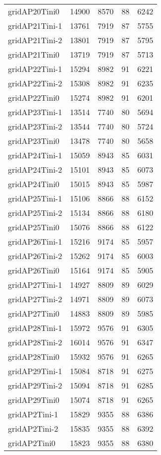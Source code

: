 \begin{longtable}{lrrrr}
gridAP20Tini0 & 14900 & 8570 & 88 & 6242 \\
gridAP21Tini-1 & 13761 & 7919 & 87 & 5755 \\
gridAP21Tini-2 & 13801 & 7919 & 87 & 5795 \\
gridAP21Tini0 & 13719 & 7919 & 87 & 5713 \\
gridAP22Tini-1 & 15294 & 8982 & 91 & 6221 \\
gridAP22Tini-2 & 15308 & 8982 & 91 & 6235 \\
gridAP22Tini0 & 15274 & 8982 & 91 & 6201 \\
gridAP23Tini-1 & 13514 & 7740 & 80 & 5694 \\
gridAP23Tini-2 & 13544 & 7740 & 80 & 5724 \\
gridAP23Tini0 & 13478 & 7740 & 80 & 5658 \\
gridAP24Tini-1 & 15059 & 8943 & 85 & 6031 \\
gridAP24Tini-2 & 15101 & 8943 & 85 & 6073 \\
gridAP24Tini0 & 15015 & 8943 & 85 & 5987 \\
gridAP25Tini-1 & 15106 & 8866 & 88 & 6152 \\
gridAP25Tini-2 & 15134 & 8866 & 88 & 6180 \\
gridAP25Tini0 & 15076 & 8866 & 88 & 6122 \\
gridAP26Tini-1 & 15216 & 9174 & 85 & 5957 \\
gridAP26Tini-2 & 15262 & 9174 & 85 & 6003 \\
gridAP26Tini0 & 15164 & 9174 & 85 & 5905 \\
gridAP27Tini-1 & 14927 & 8809 & 89 & 6029 \\
gridAP27Tini-2 & 14971 & 8809 & 89 & 6073 \\
gridAP27Tini0 & 14883 & 8809 & 89 & 5985 \\
gridAP28Tini-1 & 15972 & 9576 & 91 & 6305 \\
gridAP28Tini-2 & 16014 & 9576 & 91 & 6347 \\
gridAP28Tini0 & 15932 & 9576 & 91 & 6265 \\
gridAP29Tini-1 & 15084 & 8718 & 91 & 6275 \\
gridAP29Tini-2 & 15094 & 8718 & 91 & 6285 \\
gridAP29Tini0 & 15074 & 8718 & 91 & 6265 \\
gridAP2Tini-1 & 15829 & 9355 & 88 & 6386 \\
gridAP2Tini-2 & 15835 & 9355 & 88 & 6392 \\
gridAP2Tini0 & 15823 & 9355 & 88 & 6380 \\

\end{longtable}
